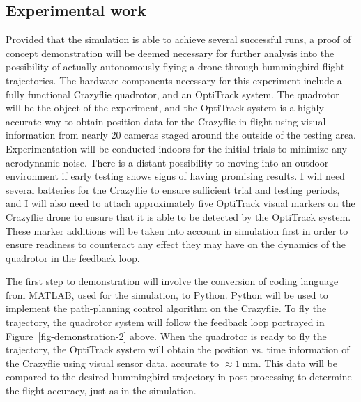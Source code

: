 \documentclass[onecolumn,10pt]{IEEEtran}
\newcommand{\MATLAB}{MATLAB}
\begin{document}
\subsection{Experimental work}
	Provided that the simulation is able to achieve several successful runs, a proof of concept demonstration will be deemed necessary for further analysis into the possibility of actually autonomously flying a drone through hummingbird flight trajectories. The hardware components necessary for this experiment include a fully functional Crazyflie quadrotor, and an OptiTrack system. The quadrotor will be the object of the experiment, and the OptiTrack system is a highly accurate way to obtain position data for the Crazyflie in flight using visual information from nearly 20 cameras staged around the outside of the testing area. Experimentation will be conducted indoors for the initial trials to minimize any aerodynamic noise. There is a distant possibility to moving into an outdoor environment if early testing shows signs of having promising results. I will need several batteries for the Crazyflie to ensure sufficient trial and testing periods, and I will also need to attach approximately five OptiTrack visual markers on the Crazyflie drone to ensure that it is able to be detected by the OptiTrack system. These marker additions will be taken into account in simulation first in order to ensure readiness to counteract any effect they may have on the dynamics of the quadrotor in the feedback loop.
	
The first step to demonstration will involve the conversion of coding language from \MATLAB, used for the simulation, to Python. Python will be used to implement the path-planning control algorithm on the Crazyflie. To fly the trajectory, the quadrotor system will follow the feedback loop portrayed in Figure~\ref{fig-demonstration-2} above. When the quadrotor is ready to fly the trajectory, the OptiTrack system will obtain the position vs. time information of the Crazyflie using visual sensor data, accurate to $\approx \SI{1}{\milli\meter}$. This data will be compared to the desired hummingbird trajectory in post-processing to determine the flight accuracy, just as in the simulation.
\end{document}
